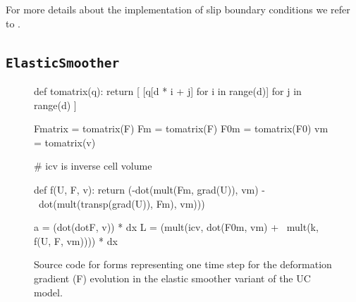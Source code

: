 For more details about the implementation of slip boundary conditions
we refer to \cite{Nazarov2009}.

\subsection{\tt ElasticSmoother}


\begin{figure}[!h]
{\small
\begin{python}
def tomatrix(q):
    return [ [q[d * i + j] for i in range(d)] for j in range(d) ]

Fmatrix = tomatrix(F)
Fm = tomatrix(F)
F0m = tomatrix(F0)
vm = tomatrix(v)

# icv is inverse cell volume

def f(U, F, v):
    return (-dot(mult(Fm, grad(U)), vm) - \
     dot(mult(transp(grad(U)), Fm), vm)))

a = (dot(dotF, v)) * dx
L = (mult(icv, dot(F0m, vm) + \
  mult(k, f(U, F, vm)))) * dx
\end{python}
}
\caption{Source code for forms representing one time step for the deformation gradient (F) evolution in the elastic smoother variant of the UC model. }
\label{code:FFC_ElasticSmoother}
\end{figure}


